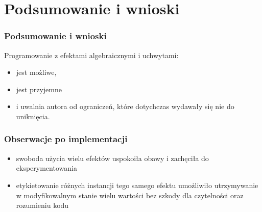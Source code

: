 
\section{Podsumowanie i wnioski}

\begin{frame}
  \frametitle{Podsumowanie i wnioski}
  Programowanie z efektami algebraicznymi i uchwytami:
  \begin{itemize}
  \item jest możliwe,
  \item jest przyjemne
  \item i uwalnia autora od ograniczeń, które dotychczas wydawały się nie do uniknięcia.
  \end{itemize}
\end{frame}

\begin{frame}
  \frametitle{Obserwacje po implementacji}
  \begin{itemize}
  \item swoboda użycia wielu efektów uspokoiła obawy i zachęciła do eksperymentowania
  \item etykietowanie różnych instancji tego samego efektu umożliwiło utrzymywanie w modyfikowalnym stanie wielu wartości bez szkody dla czytelności oraz rozumieniu kodu
  \end{itemize}
\end{frame}
